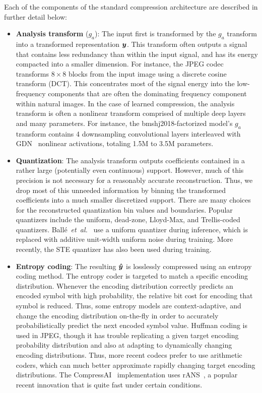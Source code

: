 Each of the components of the standard compression architecture are described in further detail below:
%
\begin{itemize}
  \item \textbf{Analysis transform} ($g_a$):
    The input first is transformed by the $g_a$ transform into a transformed representation ${\boldsymbol{y}}$.
    This transform often outputs a signal that contains less redundancy than within the input signal, and has its energy compacted into a smaller dimension.
    For instance, the JPEG codec transforms $8 \times 8$ blocks from the input image using a discrete cosine transform (DCT).
    This concentrates most of the signal energy into the low-frequency components that are often the dominating frequency component within natural images.
    In the case of learned compression, the analysis transform is often a nonlinear transform comprised of multiple deep layers and many parameters.
    For instance, the bmshj2018-factorized model's $g_a$ transform contains 4 downsampling convolutional layers interleaved with GDN~\cite{balle2016gdn} nonlinear activations, totaling 1.5M to 3.5M parameters.

  \item \textbf{Quantization}:
    The analysis transform outputs coefficients contained in a rather large (potentially even continuous) support.
    However, much of this precision is not necessary for a reasonably accurate reconstruction.
    Thus, we drop most of this unneeded information by binning the transformed coefficients into a much smaller discretized support.
    There are many choices for the reconstructed quantization bin values and boundaries.
    Popular quantizers include the uniform, dead-zone, Lloyd-Max, and Trellis-coded quantizers.
    Ballé~\emph{et~al.}~\cite{balle2018variational} use a uniform quantizer during inference, which is replaced with additive unit-width uniform noise during training.
    More recently, the STE quantizer has also been used during training.

  \item \textbf{Entropy coding}:
    The resulting ${\boldsymbol{\hat{y}}}$ is losslessly compressed using an entropy coding method.
    The entropy coder is targeted to match a specific encoding distribution.
    Whenever the encoding distribution correctly predicts an encoded symbol with high probability, the relative bit cost for encoding that symbol is reduced.
    Thus, some entropy models are context-adaptive, and change the encoding distribution on-the-fly in order to accurately probabilistically predict the next encoded symbol value.
    Huffman coding is used in JPEG, though it has trouble replicating a given target encoding probability distribution and also at adapting to dynamically changing encoding distributions.
    Thus, more recent codecs prefer to use arithmetic coders, which can much better approximate rapidly changing target encoding distributions.
    The CompressAI~\cite{begaint2020compressai} implementation uses rANS~\cite{duda2013asymmetric,giesen2014ryg_rans}, a popular recent innovation that is quite fast under certain conditions.


\end{itemize}
